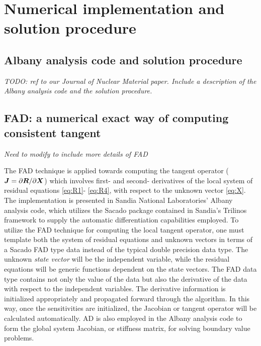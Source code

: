 \section{Numerical implementation and solution procedure} \label{sec:implementation}

\subsection{Albany analysis code and solution procedure}
\textit{TODO: ref to our Journal of Nuclear Material paper. Include a 
description of the Albany analysis code and the solution procedure.}


\subsection{FAD: a numerical exact way of computing consistent tangent}                                                                     
\textit{Need to modify to include more details of FAD}

The FAD technique is applied towards computing the tangent operator ($
{\boldsymbol{J}} = \partial{\boldsymbol{R}} / \partial{\boldsymbol{X}}$) which involves first- and second-
derivatives of the local system of residual equations \eqref{eq:R1}-
\eqref{eq:R4}, with respect to the unknown vector \eqref{eq:X}. The 
implementation is presented in Sandia National Laboratories' Albany 
analysis code\cite{Salinger2013}, which utilizes the Sacado package 
contained in Sandia's Trilinos framework to supply the 
automatic differentiation capabilities employed. To utilize the FAD 
technique for computing the local tangent operator, one must template 
both the system of residual equations and unknown vectors in terms of 
a Sacado FAD type data instead of the typical double precision data 
type. The unknown {\em state vector} will be the independent 
variable,  while the residual equations will be generic functions 
dependent on  the state vectors. The FAD data type contains not only 
the value of the data but also the derivative of the data with 
respect to the independent variables. The derivative information is 
initialized appropriately and propagated forward through the 
algorithm. In this way, once the sensitivities are initialized, the 
Jacobian or tangent operator will be calculated automatically. AD is 
also employed in the Albany analysis code to form the global system 
Jacobian, or stiffness matrix, for solving boundary value problems.




